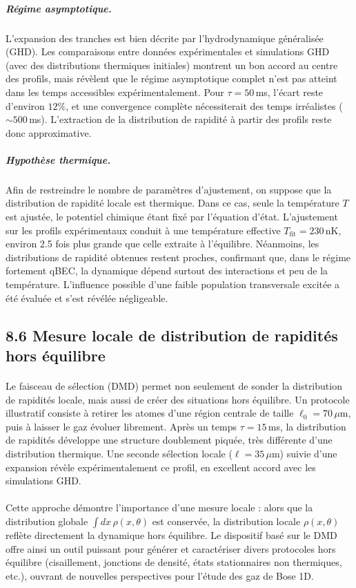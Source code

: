 \subparagraph{Régime asymptotique.}  
L’expansion des tranches est bien décrite par l’hydrodynamique généralisée (GHD). Les comparaisons entre données expérimentales et simulations GHD (avec des distributions thermiques initiales) montrent un bon accord au centre des profils, mais révèlent que le régime asymptotique complet n’est pas atteint dans les temps accessibles expérimentalement. Pour $\tau=50$\,ms, l’écart reste d’environ $12\%$, et une convergence complète nécessiterait des temps irréalistes ($\sim 500$\,ms). L’extraction de la distribution de rapidité à partir des profils reste donc approximative.

\subparagraph{Hypothèse thermique.}  
Afin de restreindre le nombre de paramètres d’ajustement, on suppose que la distribution de rapidité locale est thermique. Dans ce cas, seule la température $T$ est ajustée, le potentiel chimique étant fixé par l’équation d’état. L’ajustement sur les profils expérimentaux conduit à une température effective $T_{\text{fit}}=230$\,nK, environ 2.5 fois plus grande que celle extraite à l’équilibre. Néanmoins, les distributions de rapidité obtenues restent proches, confirmant que, dans le régime fortement qBEC, la dynamique dépend surtout des interactions et peu de la température. L’influence possible d’une faible population transversale excitée a été évaluée et s’est révélée négligeable.

\subsection*{8.6 Mesure locale de distribution de rapidités hors équilibre}

\paragraph{}  
Le faisceau de sélection (DMD) permet non seulement de sonder la distribution de rapidités locale, mais aussi de créer des situations hors équilibre. Un protocole illustratif consiste à retirer les atomes d’une région centrale de taille $\ell_0 = 70\,\mu$m, puis à laisser le gaz évoluer librement. Après un temps $\tau = 15$\,ms, la distribution de rapidités développe une structure doublement piquée, très différente d’une distribution thermique. Une seconde sélection locale ($\ell=35\,\mu$m) suivie d’une expansion révèle expérimentalement ce profil, en excellent accord avec les simulations GHD.

\paragraph{}  
Cette approche démontre l’importance d’une mesure locale : alors que la distribution globale $\int dx\,\rho(x,\theta)$ est conservée, la distribution locale $\rho(x,\theta)$ reflète directement la dynamique hors équilibre. Le dispositif basé sur le DMD offre ainsi un outil puissant pour générer et caractériser divers protocoles hors équilibre (cisaillement, jonctions de densité, états stationnaires non thermiques, etc.), ouvrant de nouvelles perspectives pour l’étude des gaz de Bose 1D.


